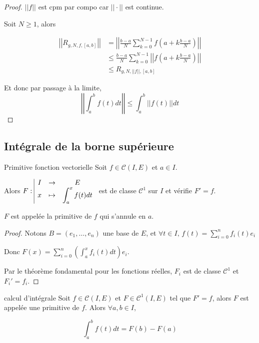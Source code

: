 
\begin{proof}
    $||f||$ est cpm par compo car $||\cdot||$ est continue.

    Soit $N \geqslant 1$, alors 

    \begin{align*}
        \left|\left| R_{g, N, f, [a, b]} \right|\right| & = \left|\left| \frac{b-a}{N} \sum_{k=0}^{N-1} f\left( a + k \frac{b-a}{N} \right) \right|\right| \\
        & \leqslant \frac{b-a}{N} \sum_{k=0}^{N-1} \left|\left| f\left( a + k \frac{b-a}{N} \right) \right|\right| \\
        & \leqslant R_{g, N, ||f||, [a, b]}
    \end{align*}

    Et donc par passage à la limite, 
    $$\left|\left| \int_a^b f(t) dt \right|\right| \leqslant \int_a^b ||f(t)|| dt$$
\end{proof}


\subsection{Intégrale de la borne supérieure }

\begin{theoreme}{Primitive fonction vectorielle}{}
    Soit $f \in \mathscr C(I, E)$ et $a \in I$. 

    Alors $F: \space \begin{array}{|ccc} \displaystyle I & \to & \displaystyle E \\ \displaystyle x & \mapsto & \displaystyle \int_a^x f(t) dt \end{array}$ est de classe $\mathscr C^1$ sur $I$ et 
    vérifie $F' = f$.

    $F$ est appelée la primitive de $f $ qui s'annule en $a$. 
\end{theoreme}


\begin{proof}
    Notons $B = (e_1, \ldots, e_n)$ une base de $E$, et $\forall t \in I, \, f(t) \displaystyle = \sum_{i = 0 }^{ n } f_i(t) e_i$

    Donc $\displaystyle F(x) = \sum_{i = 0 }^{ n } \left( \int_a^x f_i(t) dt \right) e_i$.

    Par le théorème fondamental pour les fonctions réelles, $F_i$ est de classe $\mathscr C^1$ et $F_i' = f_i$.
\end{proof}

\begin{corollaire}{calcul d'intégrale}{}
    Soit $f \in \mathscr C(I, E)$ et $F \in \mathscr C^1(I, E)$ tel que 
    $F' = f$, alors $F$ est appelée une primitive de $f$. Alors $\forall a, b \in I$, 
    
    $$\displaystyle \int_a^b f(t) dt = F(b) - F(a)$$
\end{corollaire}


